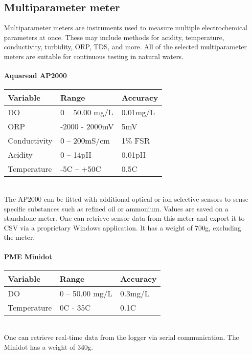 \newpage
\subsection{Multiparameter meter}
Multiparameter meters are instruments used to measure multiple electrochemical parameters at once. These may include methods for acidity, temperature, conductivity, turbidity, ORP, TDS, and more. All of the selected multiparameter meters are suitable for continuous testing in natural waters.

\paragraph{Aquaread AP2000}\mbox{} \cite{AP2000}
\begin{table}[h!]
	\centering
	\quad
	\begin{tabular}{| l | l | l |}
    \hline
    Variable & Range & Accuracy\\
    \hline
    DO & 0 – 50.00 mg/L & 0.01mg/L\\
    ORP & -2000 - 2000mV & 5mV\\
    Conductivity & 0 – 200mS/cm & 1\% FSR\\
    Acidity & 0 – 14pH & 0.01pH\\
    Temperature & -5C – +50C & 0.5C\\
    \hline
	\end{tabular}
\end{table}
\\The AP2000 can be fitted with additional optical or ion selective sensors to sense specific substances such as refined oil or ammonium. Values are saved on a standalone meter. One can retrieve sensor data from this meter and export it to CSV via a proprietary Windows application. It has a weight of 700g, excluding the meter.

\paragraph{PME Minidot}\mbox{} \cite{minidot}
\begin{table}[h!]
	\centering
	\quad
	\begin{tabular}{| l | l | l |}
    \hline
    Variable & Range & Accuracy\\
    \hline
    DO & 0 – 50.00 mg/L & 0.3mg/L\\
    Temperature & 0C - 35C & 0.1C\\
    \hline
	\end{tabular}
\end{table}
\\One can retrieve real-time data from the logger via serial communication. The Minidot has a weight of 340g.

